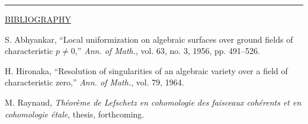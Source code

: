 \begin{center}\rule{1.5cm}{0.4pt}\end{center}

\begin{center}\underline{BIBLIOGRAPHY}\end{center}

\begin{enumerate}[label={[\arabic*]},leftmargin=3em]
\item S. Abhyankar, ``Local uniformization on algebraic surfaces over
ground fields of characteristic $p\neq0$,'' \emph{Ann. of Math.},
vol. 63, no. 3, 1956, pp. 491--526.

\item H. Hironaka, ``Resolution of singularities of an algebraic variety
over a field of characteristic zero,'' \emph{Ann. of Math.}, vol. 79,
1964.

\item M. Raynaud, \emph{Th\'eor\`eme de Lefschetz en cohomologie des
faisceaux coh\'erents et en cohomologie \'etale}, thesis, forthcoming.
\end{enumerate}
